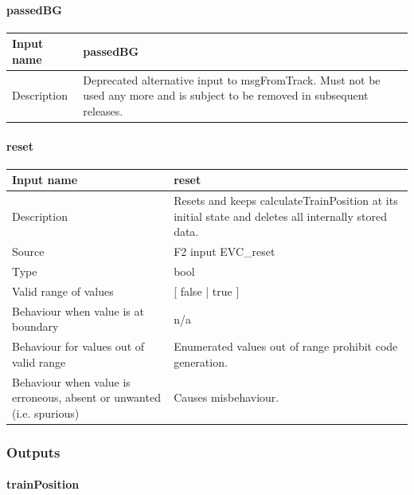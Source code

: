 \paragraph{passedBG}

\begin{longtable}{p{}p{}}
\toprule
Input name				& passedBG \\
\midrule
Description				& Deprecated alternative input to msgFromTrack. Must not be used any more and is subject to be removed in subsequent releases.  \\
\bottomrule
\end{longtable}


\paragraph{reset}

\begin{longtable}{p{}p{}}
\toprule
Input name				& reset \\
\midrule
Description				& Resets and keeps calculateTrainPosition at its initial state and deletes all internally stored data.  \\
\midrule
Source					& F2 input EVC\_reset \\ 
\midrule
Type					& bool \\  
\midrule
Valid range of values	& [ false | true ] \\
\midrule
Behaviour when value is at boundary	& n/a \\
\midrule
Behaviour for values out of valid range	& Enumerated values out of range prohibit code generation. \\
\midrule
Behaviour when value is erroneous, absent or unwanted (i.e. spurious) & Causes misbehaviour.
\\
\bottomrule
\end{longtable}


\subsubsection{Outputs}\label{s:calculateTrainPosition_outputs}

\paragraph{trainPosition}

